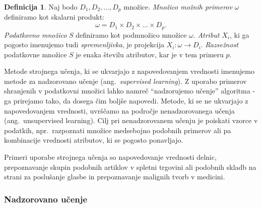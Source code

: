 \documentclass[12pt,a4paper,twoside]{article}
\theoremstyle{definition} %
\newtheorem{definicija}{Definicija}[section]
\theoremstyle{plain} %
\numberwithin{equation}{section}  %
\begin{document}
\begin{definicija}
	Naj bodo $D_1, D_2, \ldots, D_p$ množice.
	\emph{Množico možnih primerov} $\omega$ definiramo kot skalarni produkt:
	\[
		\omega = D_1 \times D_2 \times \dots \times D_p.
	\]
	\emph{Podatkovno množico} $S$ definiramo kot podmnožico množice $\omega$.
	\emph{Atribut} $X_i$, ki ga pogosto imenujemo tudi \emph{spremenljivka}, je projekcija $X_i : \omega \rightarrow D_i$.
	\emph{Razsežnost} podatkovne množice $S$ je enaka številu atributov, kar je v tem primeru $p$.
\end{definicija}

Metode strojnega učenja, ki se ukvarjajo z napovedovanjem vrednosti imenujemo metode za nadzorovano učenje (ang.~\emph{supervised learning}). 
Z uporabo primerov shranjenih v podatkovni množici lahko namreč ``nadzorujemo učenje'' algoritma - ga prirejamo tako, da dosega čim boljše napovedi.
Metode, ki se ne ukvarjajo z napovedovanjem vrednosti, uvrščamo na področje nenadzorovanega učenja (ang.~unsupervised learning).
Cilj pri nenadzorovanem učenju je poiskati vzorce v podatkih, npr.\ razpoznati množice medsebojno podobnih primerov ali pa kombinacije vrednosti atributov, ki se pogosto ponavljajo.

Primeri uporabe strojnega učenja so napovedovanje vrednosti delnic, prepoznavanje skupin podobnih artiklov v spletni trgovini ali podobnih skladb na strani za poslušanje glasbe in prepoznavanje malignih tvorb v medicini.


\subsubsection{Nadzorovano učenje}
\end{document}
